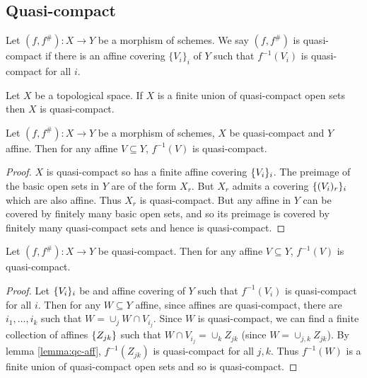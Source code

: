 \documentclass{memoir}
\begin{document}
\subsection{Quasi-compact}
\begin{definition}
    Let $(f,f^\#):X\to Y$ be a morphism of schemes.
    We say $(f,f^\#)$ is quasi-compact if there is an affine covering $\{V_i\}_i$ of $Y$ such that $f^{-1}(V_i)$ is quasi-compact for all $i$.
\end{definition}
\begin{lemma}
    Let $X$ be a topological space.
    If $X$ is a finite union of quasi-compact open sets then $X$ is quasi-compact.
\end{lemma}
\begin{lemma}
    \label{lemma:qc-aff}
    Let $(f,f^\#):X\to Y$ be a morphism of schemes, $X$ be quasi-compact and $Y$ affine.
    Then for any affine $V\subseteq Y$, $f^{-1}(V)$ is quasi-compact.
\end{lemma}
\begin{proof}
    $X$ is quasi-compact so has a finite affine covering $\lbrace V_i\rbrace_i$. 
    The preimage of the basic open sets in $Y$ are of the form $X_r$.
    But $X_r$ admits a covering $\lbrace(V_i)_r\rbrace_i$ which are also affine.
    Thus $X_r$ is quasi-compact.
    But any affine in $Y$ can be covered by finitely many basic open sets, and so its preimage is covered by finitely many quasi-compact sets and hence is quasi-compact.
\end{proof}
\begin{thm}
    Let $(f,f^\#):X\to Y$ be quasi-compact.
    Then for any affine $V\subseteq Y$, $f^{-1}(V)$ is quasi-compact.
\end{thm}
\begin{proof}
    Let $\lbrace V_i\rbrace_i$ be and affine covering of $Y$ such that $f^{-1}(V_i)$ is quasi-compact for all $i$.
    Then for any $W\subseteq Y$ affine, since affines are quasi-compact, there are $i_1,\dots,i_k$ such that $W = \cup_jW\cap V_{i_j}$.
    Since $W$ is quasi-compact, we can find a finite collection of affines $\lbrace Z_{jk}\rbrace$ such that $W\cap V_{i_j} = \cup_kZ_{jk}$ (since $W = \cup_{j,k}Z_{jk}$).
    By lemma \ref{lemma:qc-aff}, $f^{-1}(Z_{jk})$ is quasi-compact for all $j,k$.
    Thus $f^{-1}(W)$ is a finite union of quasi-compact open sets and so is quasi-compact.
\end{proof}
\end{document}
